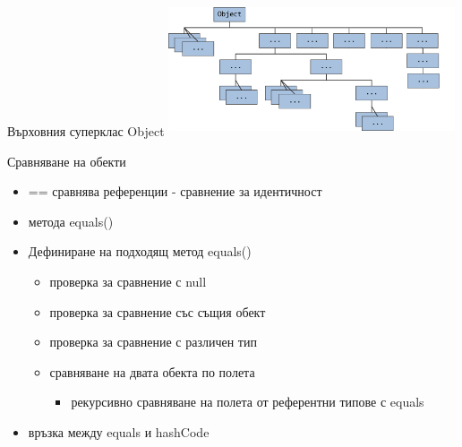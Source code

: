 \documentclass{beamer}
\begin{document}
\begin{frame}{Върховния суперклас Object}
  \transdissolve
  \includegraphics[width=320px, height=150px]{images/classes-object.png}
\end{frame}


\begin{frame}{Сравняване на обекти}
  \transdissolve
  \begin{itemize}
  \item == сравнява референции - сравнение за идентичност
  \item метода equals()
  \item Дефиниране на подходящ метод equals()
    \begin{itemize}
      \item проверка за сравнение с null
      \item проверка за сравнение със същия обект
      \item проверка за сравнение с различен тип
      \item сравняване на двата обекта по полета
      \begin{itemize}
        \item рекурсивно сравняване на полета от референтни типове с equals
      \end{itemize}
    \end{itemize}
  \item връзка между equals и hashCode
  \end{itemize}
\end{frame}
\end{document}

